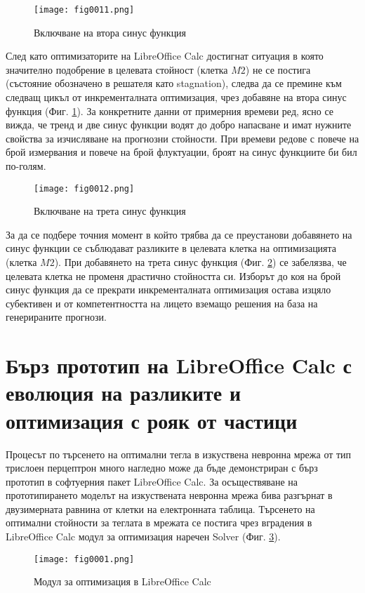 \begin{figure}[H]
  \centering
  \texttt{[image: fig0011.png]}
  \caption{Включване на втора синус функция}
\label{fig0011}
\end{figure}

След като оптимизаторите на LibreOffice Calc достигнат ситуация в която значително подобрение в целевата стойност (клетка $M2$) не се постига (състояние обозначено в решателя като stagnation), следва да се премине към следващ цикъл от инкременталната оптимизация, чрез добавяне на втора синус функция (Фиг. \ref{fig0011}). За конкретните данни от примерния времеви ред, ясно се вижда, че тренд и две синус функции водят до добро напасване и имат нужните свойства за изчисляване на прогнозни стойности. При времеви редове с повече на брой измервания и повече на брой флуктуации, броят на синус функциите би бил по-голям. 

\begin{figure}[H]
  \centering
  \texttt{[image: fig0012.png]}
  \caption{Включване на трета синус функция}
\label{fig0012}
\end{figure}

За да се подбере точния момент в който трябва да се преустанови добавянето на синус функции се съблюдават разликите в целевата клетка на оптимизацията (клетка $M2$). При добавянето на трета синус функция (Фиг. \ref{fig0012}) се забелязва, че целевата клетка не променя драстично стойността си. Изборът до коя на брой синус функция да се прекрати инкременталната оптимизация остава изцяло субективен и от компетентността на лицето вземащо решения на база на генерираните прогнози. 

\section{Бърз прототип на LibreOffice Calc с еволюция на разликите и оптимизация с рояк от частици}

Процесът по търсенето на оптимални тегла в изкуствена невронна мрежа от тип трислоен перцептрон много нагледно може да бъде демонстриран с бърз прототип в софтуерния пакет LibreOffice Calc. За осъществяване на прототипирането моделът на изкуствената невронна мрежа бива разгърнат в двузимерната равнина от клетки на електронната таблица. Търсенето на оптимални стойности за теглата в мрежата се постига чрез вградения в LibreOffice Calc модул за оптимизация наречен Solver (Фиг. \ref{fig0001}).

\begin{figure}[H]
  \centering
  \texttt{[image: fig0001.png]}
  \caption{Модул за оптимизация в LibreOffice Calc}
\label{fig0001}
\end{figure}

